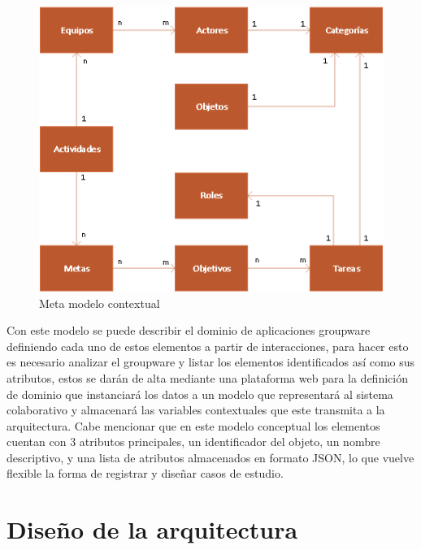\begin{figure}[h!]
  \centering
    \includegraphics[scale=0.7]{images/MERMetamodel}
  \caption{Meta modelo contextual \cite{montane2013context}}
  \label{cmp:mmc}
\end{figure}


Con este modelo se puede describir el dominio de aplicaciones groupware definiendo cada uno de estos elementos a partir de interacciones, para hacer esto es necesario analizar el groupware y listar los elementos identificados as\'i como sus atributos, estos se 
dar\'an de alta mediante una plataforma web para la definici\'on de dominio que instanciar\'a los datos a un modelo que representar\'a al sistema colaborativo y almacenar\'a las variables contextuales que este transmita a la arquitectura. Cabe mencionar que en este modelo conceptual los elementos cuentan con 3 atributos principales, un identificador del objeto, un nombre descriptivo, y una lista de atributos almacenados en formato JSON, lo que vuelve flexible la forma de registrar y dise\~nar casos de estudio.

\section{Dise\~no de la arquitectura}

